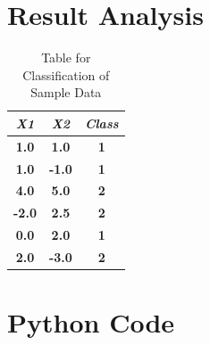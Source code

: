 \documentclass[conference]{IEEEtran}
\begin{document}
\section{Result Analysis}
\begin{table}[htbp]
\caption{Table for Classification of Sample Data}
\begin{center}
\begin{tabular}{|c|c|c|}
\hline
\textbf{\textit{X1}}&\textbf{\textit{X2}}& \textbf{\textit{Class}} \\
\hline
\textbf{{1.0}}&\textbf{{1.0}}&   \textbf{{1}} \\
\hline
\textbf{{1.0}}&\textbf{{-1.0}}&   \textbf{{1}} \\
\hline
\textbf{{4.0}}&\textbf{{5.0}}&   \textbf{{2}} \\
\hline
\textbf{{-2.0}}&\textbf{{2.5}}&   \textbf{{2}} \\
\hline
\textbf{{0.0}}&\textbf{{2.0}}&   \textbf{{1}} \\
\hline
\textbf{{2.0}}&\textbf{{-3.0}}&   \textbf{{2}} \\
\hline
\end{tabular}
\label{tab1}
\end{center}
\end{table}

\section{Python Code}
\end{document}
